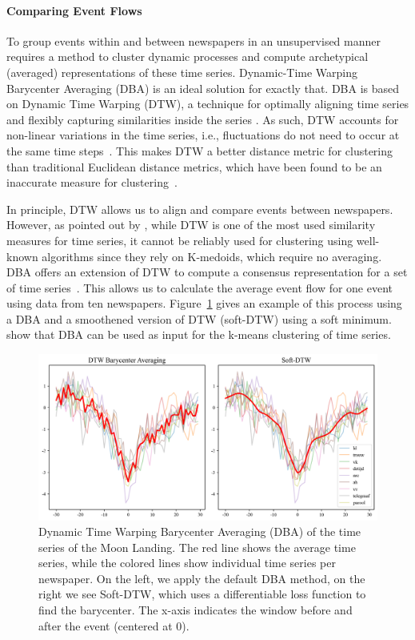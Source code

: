 \documentclass[]{ceurart}
\begin{document}
\paragraph{Comparing Event Flows}
To group events within and between newspapers in an unsupervised manner requires a method to cluster dynamic processes and compute archetypical (averaged) representations of these time series. Dynamic-Time Warping Barycenter Averaging (DBA) is an ideal solution for exactly that. DBA is based on Dynamic Time Warping (DTW), a technique for optimally aligning time series and flexibly capturing similarities inside the series \cite{petitjean2011global}. As such, DTW accounts for non-linear variations in the time series, i.e., fluctuations do not need to occur at the same time steps~\cite{rakthanmanon2013addressing}. This makes DTW a better distance metric for clustering than traditional Euclidean distance metrics, which have been found to be an inaccurate measure for clustering~\cite{liao2005clustering,petitjean2011global}. 

In principle, DTW allows us to align and compare events between newspapers. However, as pointed out by \cite{petitjean2011global}, while DTW is one of the most used similarity measures for time series, it cannot be reliably used for clustering using well-known algorithms since they rely on K-medoids, which require no averaging. DBA offers an extension of DTW to compute a consensus representation for a set of time series~\cite{petitjean2011global}. This allows us to calculate the average event flow for one event using data from ten newspapers. Figure~\ref{fig:event_flow_moon_landing} gives an example of this process using a DBA and a smoothened version of DTW (soft-DTW) using a soft minimum. \citeauthor{petitjean2011global} show that DBA can be used as input for the k-means clustering of time series. 

\begin{figure}
    \centering
    \includegraphics[width=\linewidth]{figures/img3.png}
    \caption{Dynamic Time Warping Barycenter Averaging (DBA) of the time series of the Moon Landing. The red line shows the average time series, while the colored lines show individual time series per newspaper. On the left, we apply the default DBA method, on the right we see Soft-DTW, which uses a differentiable loss function to find the barycenter. The x-axis indicates the window before and after the event (centered at 0).}
    \label{fig:event_flow_moon_landing}
\end{figure}
\end{document}
